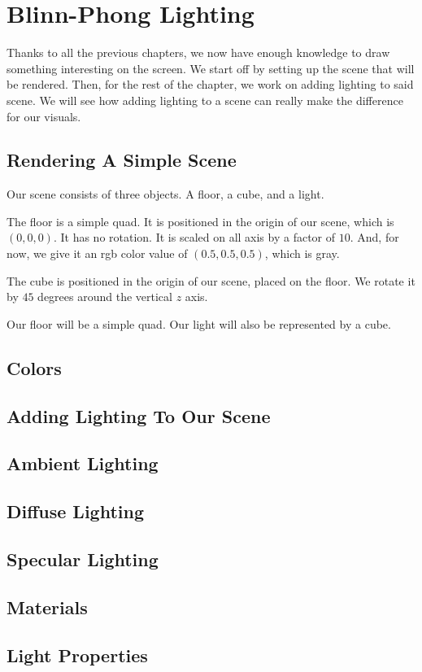 \chapter{Blinn-Phong Lighting}

Thanks to all the previous chapters, we now have enough knowledge to draw
something interesting on the screen.
We start off by setting up the scene that will be rendered.
Then, for the rest of the chapter, we work on adding lighting to said scene.
We will see how adding lighting to a scene can really make the difference
for our visuals.

\section{Rendering A Simple Scene}

Our scene consists of three objects.
A floor, a cube, and a light.

The floor is a simple quad.
It is positioned in the origin of our scene, which is $(0, 0, 0)$.
It has no rotation.
It is scaled on all axis by a factor of $10$.
And, for now, we give it an rgb color value of $(0.5, 0.5, 0.5)$,
which is gray.

The cube is positioned in the origin of our scene, placed on the floor.
We rotate it by $45$ degrees around the vertical $z$ axis.

Our floor will be a simple quad.
Our light will also be represented by a cube.


\subsection{}

\section{Colors}

\section{Adding Lighting To Our Scene}

\section{Ambient Lighting}

\section{Diffuse Lighting}

\section{Specular Lighting}

\section{Materials}

\section{Light Properties}
